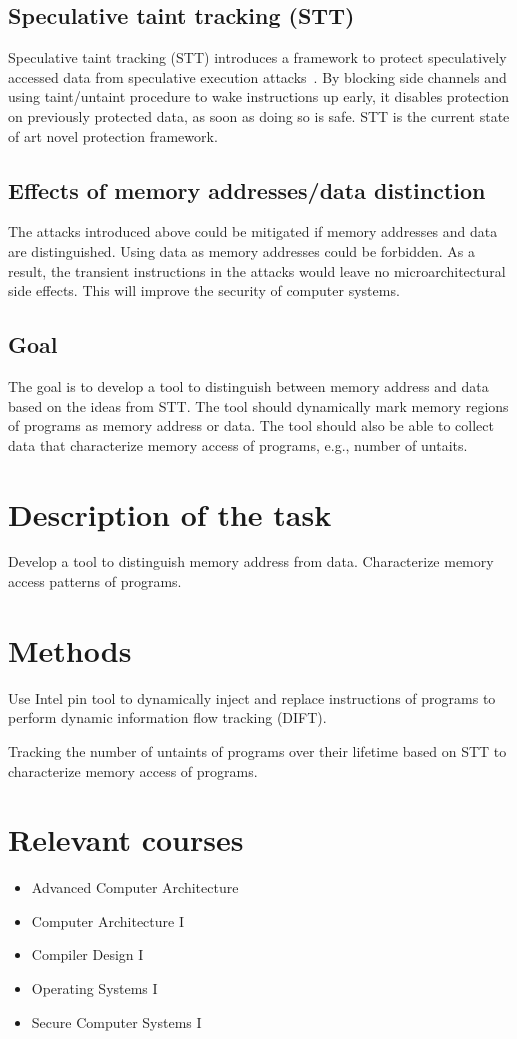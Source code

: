 \documentclass[a4paper]{article}
\begin{document}
\subsection{Speculative taint tracking (STT)}
Speculative taint tracking (STT) introduces a framework to protect
speculatively accessed data from speculative execution
attacks~\cite{yu2019speculative}. By blocking side channels and using
taint/untaint procedure to wake instructions up early, it disables
protection on previously protected data, as soon as doing so is safe.
STT is the current state of art novel protection framework.

\subsection{Effects of memory addresses/data distinction}
The attacks introduced above could be mitigated if memory addresses
and data are distinguished. Using data as memory addresses could be
forbidden. As a result, the transient instructions in the attacks
would leave no microarchitectural side effects. This will improve the
security of computer systems.

\subsection{Goal}
The goal is to develop a tool to distinguish between memory address
and data based on the ideas from STT. The tool should dynamically mark
memory regions of programs as memory address or data. The tool should
also be able to collect data that characterize memory access of
programs, e.g., number of untaits.

\section{Description of the task}
Develop a tool to distinguish memory address from data. Characterize
memory access patterns of programs.

\section{Methods}
Use Intel pin tool to dynamically inject and replace instructions of
programs to perform dynamic information flow tracking (DIFT).

Tracking the number of untaints of programs over their lifetime based
on STT to characterize memory access of programs.

\section{Relevant courses}
\begin{itemize}
\item Advanced Computer Architecture
\item Computer Architecture I
\item Compiler Design I
\item Operating Systems I
\item Secure Computer Systems I
\end{itemize}
\end{document}
